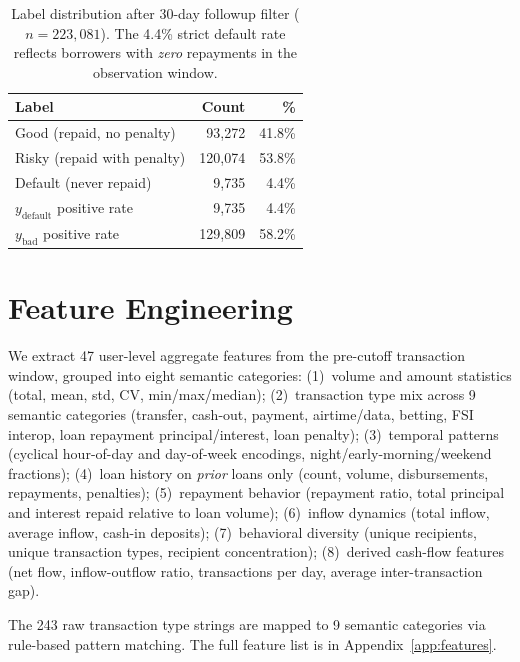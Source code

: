 \documentclass{article}
\begin{document}
\begin{table}[h]
\caption{Label distribution after 30-day followup filter ($n=223{,}081$).
  The 4.4\% strict default rate reflects borrowers with \emph{zero}
  repayments in the observation window.}
\label{tab:labels}
\vskip 0.1in
\begin{center}
\begin{small}
\begin{tabular}{lrr}
\toprule
Label & Count & \% \\
\midrule
Good (repaid, no penalty)   & 93,272  & 41.8\% \\
Risky (repaid with penalty) & 120,074 & 53.8\% \\
Default (never repaid)      & 9,735   &  4.4\% \\
\midrule
$y_{\text{default}}$ positive rate & 9,735   &  4.4\% \\
$y_{\text{bad}}$ positive rate     & 129,809 & 58.2\% \\
\bottomrule
\end{tabular}
\end{small}
\end{center}
\vskip -0.1in
\end{table}

\section{Feature Engineering}

We extract 47 user-level aggregate features from the pre-cutoff
transaction window, grouped into eight semantic categories:
(1)~volume and amount statistics (total, mean, std, CV, min/max/median);
(2)~transaction type mix across 9 semantic categories (transfer,
cash-out, payment, airtime/data, betting, FSI interop, loan repayment
principal/interest, loan penalty);
(3)~temporal patterns (cyclical hour-of-day and day-of-week encodings,
night/early-morning/weekend fractions);
(4)~loan history on \emph{prior} loans only (count, volume,
disbursements, repayments, penalties);
(5)~repayment behavior (repayment ratio, total principal and interest
repaid relative to loan volume);
(6)~inflow dynamics (total inflow, average inflow, cash-in deposits);
(7)~behavioral diversity (unique recipients, unique transaction types,
recipient concentration);
(8)~derived cash-flow features (net flow, inflow-outflow ratio,
transactions per day, average inter-transaction gap).

The 243 raw transaction type strings are mapped to 9 semantic categories
via rule-based pattern matching.
The full feature list is in Appendix~\ref{app:features}.
\end{document}
